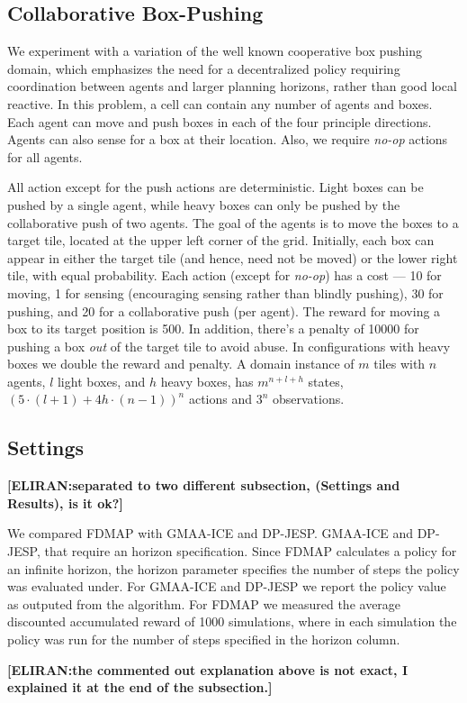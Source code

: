 \documentclass[letterpaper]{article} %
\theoremstyle{definition}
\newcommand{\commentout}[1]{}
\newcommand{\eliran}[1]{\textbf{[\color{red}ELIRAN:#1]}}
\newcommand{\cbp}[0]{Collaborative Box-Pushing}
\begin{document}
\subsection{\cbp}

We experiment with a variation of the well known cooperative box pushing domain, which emphasizes the need for a decentralized policy requiring coordination between agents and larger planning horizons, rather than good local reactive. In this problem, a cell can contain any number of agents and boxes. Each agent can move and push boxes in each of the four principle directions. Agents can also sense for a box at their location. Also, we require {\em no-op} actions for all agents.

All action except for the push actions are deterministic.
Light boxes can be pushed by a single agent, while heavy boxes can only be pushed by the collaborative push of two agents.
The goal of the agents is to move the boxes to a target tile, located at the upper left corner of the grid.
Initially, each box can appear in either the target tile (and hence, need not be moved) or the lower right tile, with equal probability.
Each action (except for {\em no-op}) has a cost --- 10 for moving, 1 for sensing (encouraging sensing rather than blindly pushing), 30 for pushing, and 20 for a collaborative push (per agent). The reward for moving a box to its target position is 500. In addition, there's a penalty of 10000 for pushing a box \emph{out} of the target tile to avoid abuse. In configurations with heavy boxes we double the reward and penalty.
A domain instance of $m$ tiles with $n$ agents, $l$ light boxes, and $h$ heavy boxes, has $m^{n+l+h}$ states, $(5\cdot(l+1)+4h\cdot(n-1))^n$ actions and $3^n$ observations.


\subsection{Settings} \eliran{separated to two different subsection, (Settings and Results), is it ok?}

We compared FDMAP with GMAA-ICE and DP-JESP. GMAA-ICE and DP-JESP, that require an horizon specification. Since FDMAP calculates a policy for an infinite horizon, the horizon parameter specifies the number of steps the policy was evaluated under.
For GMAA-ICE and DP-JESP we report the policy value as outputed from the algorithm. For FDMAP we measured the average discounted accumulated reward of 1000 simulations, where in each simulation the policy was run for the number of steps specified in the horizon column. 
\commentout{
The last horizon prefixed with Max is the maximal horizon measured for reaching the goal state in all simulations.}
\eliran{the commented out explanation above is not exact, I explained it at the end of the subsection.}
\end{document}
